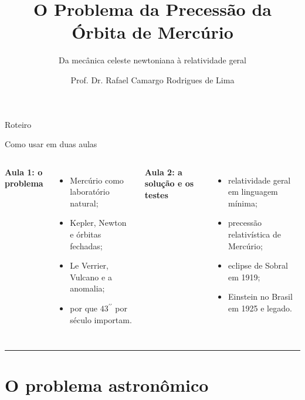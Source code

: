 \documentclass[aspectratio=169,10pt]{beamer}
\title[Precessão de Mercúrio]{O Problema da Precessão da Órbita de Mercúrio}
\subtitle{Da mecânica celeste newtoniana à relatividade geral}
\author{Prof. Dr. Rafael Camargo Rodrigues de Lima}
\institute{Astronomia}
\date{}
\newcommand{\arcsec}{^{\prime\prime}}
\newcommand{\goldline}{%
  {\color{MercuryAccent}\rule{0.32\paperwidth}{0.45pt}}%
}
\begin{document}
\begin{frame}
  \titlepage
\end{frame}

\begin{frame}{Roteiro}
  \tableofcontents
\end{frame}

\begin{frame}{Como usar em duas aulas}
  \begin{columns}[T,onlytextwidth]
    {\color{MercuryAccent}\textbf{Aula 1: o problema}}
    \vspace{0.2cm}
    \begin{itemize}
      \item Mercúrio como laboratório natural;
      \item Kepler, Newton e órbitas fechadas;
      \item Le Verrier, Vulcano e a anomalia;
      \item por que $43\arcsec$ por século importam.
    \end{itemize}

    {\color{MercuryAccent}\textbf{Aula 2: a solução e os testes}}
    \vspace{0.2cm}
    \begin{itemize}
      \item relatividade geral em linguagem mínima;
      \item precessão relativística de Mercúrio;
      \item eclipse de Sobral em 1919;
      \item Einstein no Brasil em 1925 e legado.
    \end{itemize}
  \end{columns}

  \vspace{0.45cm}
  \centering
  \goldline
\end{frame}

\section{O problema astronômico}
\end{document}
